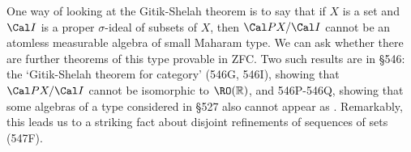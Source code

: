 One way of looking at the Gitik-Shelah theorem is to say that if $X$ is a 
set and $\Cal I$ is a proper $\sigma$-ideal of subsets of $X$, then  
$\Cal PX/\Cal I$ cannot be an atomless measurable algebra of small Maharam 
type.   We can ask whether there are further theorems of this type provable 
in ZFC.   Two such results are in \S546:  the `Gitik-Shelah theorem for 
category' (546G, 546I), showing that $\Cal PX/\Cal I$ cannot be isomorphic 
to $\RO(\Bbb R)$, and 546P-546Q, 
showing that some algebras of a type considered in \S527 also cannot appear 
as .   Remarkably, this leads us to a striking fact about disjoint 
refinements of sequences of sets (547F). 
 
\discrpage 
 
